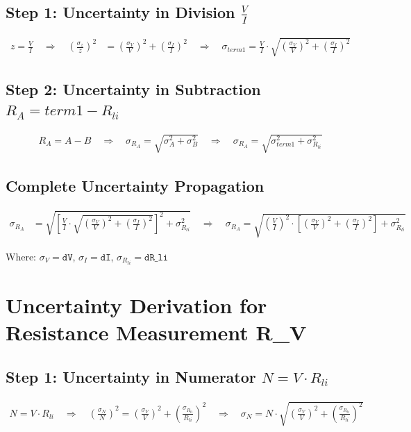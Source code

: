\documentclass{article} %
\begin{document}
\subsection*{Step 1: Uncertainty in Division $\frac{V}{I}$}
\begin{align*}
z = \frac{V}{I} \quad \Rightarrow \quad \left(\frac{\sigma_z}{z}\right)^2 &= \left(\frac{\sigma_V}{V}\right)^2 + \left(\frac{\sigma_I}{I}\right)^2 \quad \Rightarrow \quad \sigma_{term1} = \frac{V}{I} \cdot \sqrt{\left(\frac{\sigma_V}{V}\right)^2 + \left(\frac{\sigma_I}{I}\right)^2}
\end{align*}

\subsection*{Step 2: Uncertainty in Subtraction $R_A = term1 - R_{li}$}
\begin{align*}
R_A = A - B \quad \Rightarrow \quad \sigma_{R_A} = \sqrt{\sigma_A^2 + \sigma_B^2} \quad \Rightarrow \quad \sigma_{R_A} = \sqrt{\sigma_{term1}^2 + \sigma_{R_{li}}^2}
\end{align*}

\subsection*{Complete Uncertainty Propagation}
\begin{align*}
\sigma_{R_A} &= \sqrt{\left[\frac{V}{I} \cdot \sqrt{\left(\frac{\sigma_V}{V}\right)^2 + \left(\frac{\sigma_I}{I}\right)^2}\right]^2 + \sigma_{R_{li}}^2} \quad \Rightarrow \quad \sigma_{R_A} = \sqrt{\left(\frac{V}{I}\right)^2 \cdot \left[\left(\frac{\sigma_V}{V}\right)^2 + \left(\frac{\sigma_I}{I}\right)^2\right] + \sigma_{R_{li}}^2}
\end{align*}

Where: $\sigma_V = \texttt{dV}$, $\sigma_I = \texttt{dI}$, $\sigma_{R_{li}} = \texttt{dR\_li}$


\newpage

\section{Uncertainty Derivation for Resistance Measurement R\_V}
\label{app:b_RV_uncertainty}

\subsection*{Step 1: Uncertainty in Numerator $N = V \cdot R_{li}$}
\begin{align*}
N = V \cdot R_{li} \quad \Rightarrow \quad \left(\frac{\sigma_N}{N}\right)^2 = \left(\frac{\sigma_V}{V}\right)^2 + \left(\frac{\sigma_{R_{li}}}{R_{li}}\right)^2 \quad \Rightarrow \quad \sigma_N = N \cdot \sqrt{\left(\frac{\sigma_V}{V}\right)^2 + \left(\frac{\sigma_{R_{li}}}{R_{li}}\right)^2}
\end{align*}
\end{document}
